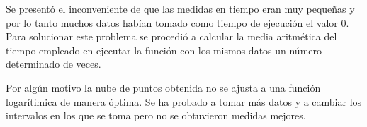 \begin{enumerate}
\begin{flushleft}
  Se presentó el inconveniente de que las medidas en tiempo eran muy
  pequeñas y por lo tanto muchos datos habían tomado como tiempo de
  ejecución el valor 0. Para solucionar este problema se procedió a
  calcular la media aritmética del tiempo empleado en ejecutar la
  función con los mismos datos un número determinado de veces.
\end{flushleft}

\begin{flushleft}
  Por algún motivo la nube de puntos obtenida no se ajusta a una
  función logarítimica de manera óptima. Se ha probado a tomar más
  datos y a cambiar los intervalos en los que se toma pero no se
  obtuvieron medidas mejores.
\end{flushleft}

\end{enumerate}
